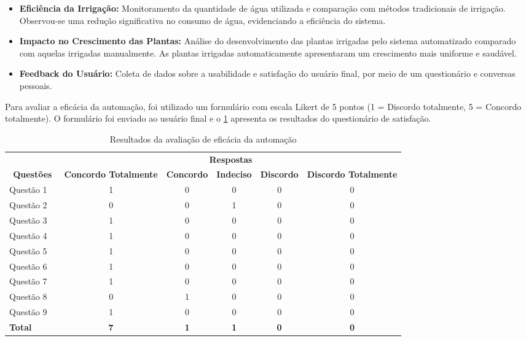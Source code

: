 \documentclass[%
  article,%
  a4paper,%
  12pt,%
  fleqn,%
  oneside,%
  chapter = TITLE,%
  section = TITLE,%
]{abntex2}
\begin{document}
\begin{itemize}
    \item \textbf{Eficiência da Irrigação:} Monitoramento da quantidade de água utilizada e comparação com métodos tradicionais de irrigação. Observou-se uma redução significativa no consumo de água, evidenciando a eficiência do sistema.
    \item \textbf{Impacto no Crescimento das Plantas:} Análise do desenvolvimento das plantas irrigadas pelo sistema automatizado comparado com aquelas irrigadas manualmente. As plantas irrigadas automaticamente apresentaram um crescimento mais uniforme e saudável.
    \item \textbf{Feedback do Usuário:} Coleta de dados sobre a usabilidade e satisfação do usuário final, por meio de um questionário e conversas pessoais.
\end{itemize}

    
    Para avaliar a eficácia da automação, foi utilizado um formulário com escala Likert de 5 pontos (1 = Discordo totalmente, 5 = Concordo totalmente). O formulário foi enviado ao usuário final e o \cref{tab:eficacia} apresenta os resultados do questionário de satisfação.
    
\begin{table}[h!]
\centering
\renewcommand{\tablename}{Quadro}
\captionsetup{justification=raggedright,singlelinecheck=false}
\caption{Resultados da avaliação de eficácia da automação}
\label{tab:eficacia}
\begin{tabular}{llccccc}
\hline
\multicolumn{2}{c}{} & \multicolumn{5}{c}{\textbf{Respostas}} \\
\cline{3-7}
\multicolumn{2}{c}{\textbf{Questões}} & \textbf{Concordo Totalmente} & \textbf{Concordo} & \textbf{Indeciso} & \textbf{Discordo} & \textbf{Discordo Totalmente} \\
\hline
Questão 1 & & 1 & 0 & 0 & 0 & 0 \\
Questão 2 & & 0 & 0 & 1 & 0 & 0 \\
Questão 3 & & 1 & 0 & 0 & 0 & 0 \\
Questão 4 & & 1 & 0 & 0 & 0 & 0 \\
Questão 5 & & 1 & 0 & 0 & 0 & 0 \\
Questão 6 & & 1 & 0 & 0 & 0 & 0 \\
Questão 7 & & 1 & 0 & 0 & 0 & 0 \\
Questão 8 & & 0 & 1 & 0 & 0 & 0 \\
Questão 9 & & 1 & 0 & 0 & 0 & 0 \\
\hline
\textbf{Total} & & \textbf{7} & \textbf{1} & \textbf{1} & \textbf{0} & \textbf{0} \\
\hline
\end{tabular}
\end{table}
\end{document}
